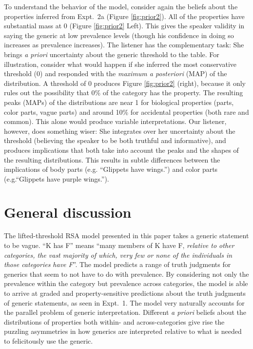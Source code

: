\documentclass[10pt,letterpaper]{article}
\begin{document}
To understand the behavior of the model, consider again the beliefs about the properties inferred from Expt.~2a (Figure \ref{fig:prior2}). 
All of the properties have substantial mass at 0 (Figure \ref{fig:prior2} Left). 
This gives the speaker validity in saying the generic at low prevalence levels (though his confidence in doing so increases as prevalence increases).
The listener has the complementary task: She brings \emph{a priori} uncertainty about the generic threshold to the table.
For illustration, consider what would happen if she inferred the most conservative threshold (0) and responded with the \emph{maximum a posteriori} (MAP) of the distribution. 
A threshold of 0 produces Figure \ref{fig:prior2} (right), because it only rules out the possibility that 0\% of the category has the property. 
The resulting peaks (MAPs) of the distributions are near 1 for biological properties (parts, color parts, vague parts) and around 10\% for accidental properties (both rare and common). This alone would produce variable interpretations. 
Our listener, however, does something wiser: She integrates over her uncertainty about the threshold (believing the speaker to be both truthful and informative), and produces implications that both take into account the peaks and the shapes of the resulting distributions.
This results in subtle differences between the implications of body parts (e.g. ``Glippets have wings.'') and  color parts (e.g.``Glippets have purple wings.''). 



\section{General discussion}

The lifted-threshold RSA model presented in this paper takes a generic statement to be vague. ``K has F'' means ``many members of K have F, \emph{relative to other categories, the vast majority of which, very few or none of the individuals in those categories have F}''. 
The model predicts a range of truth judgments for generics that seem to not have to do with prevalence. 
By considering not only the prevalence within the category but prevalence across categories, the model is able to arrive at graded and property-sensitive predictions about the truth judgments of generic statements, as seen in Expt.~1. 
The model very naturally accounts for the parallel problem of generic interpretation. 
Different \emph{a priori} beliefs about the distributions of properties both within- and across-categories give rise the puzzling asymmetries in how generics are interpreted relative to what is needed to felicitously use the generic. 
\end{document}
